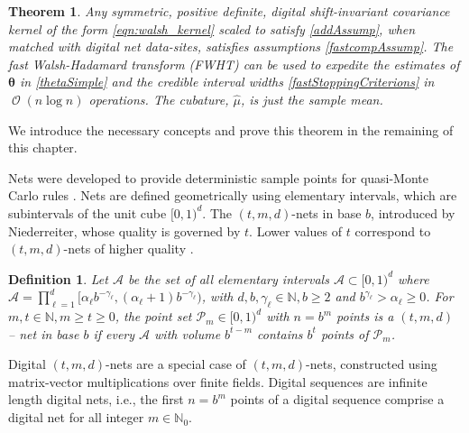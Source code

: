 \documentclass{iitthesis}          %
\DeclareMathOperator{\Order}{{\mathcal O}}
\newtheorem{defn}{Definition}
\newcommand{\bm}[1]{\boldsymbol{#1}}
\newcommand{\naturals}{\mathbb{N}}
\newcommand{\vtheta}{{\bm{\theta}}}
\newcommand{\hmu}{\widehat{\mu}}
\newcommand{\JRNote}[1]{}
\newtheorem{theorem}{Theorem}[section]
\begin{document}


\begin{theorem}
	Any symmetric, positive definite, digital shift-invariant covariance kernel of the form \eqref{eqn:walsh_kernel} scaled to satisfy \eqref{addAssump}, when matched with digital net data-sites, satisfies assumptions \eqref{fastcompAssump}.  The \emph{fast Walsh-Hadamard transform} (FWHT) can be used to expedite the estimates of $\vtheta$ in \eqref{thetaSimple} and the credible interval widths \eqref{fastStoppingCriterions} in $\Order(n \log n)$ operations. The cubature, $\hmu$, is just the sample mean.
\end{theorem}
We introduce the necessary concepts and prove this theorem in the remaining of this chapter.



Nets were developed to provide deterministic sample points for quasi-Monte Carlo rules \cite{Nie05a}. Nets are defined geometrically using elementary intervals, which are subintervals of the unit cube $[0,1)^d$.
The $(t,m, d)$-nets in base $b$, introduced by Niederreiter, 
whose quality is governed by $t$. Lower values of $t$ correspond to $(t,m, d)$-nets of higher quality \cite{Bald10a}.

\begin{defn}
	\label{defn:tmd_net}
	Let $\mathcal{A}$ be the set of all elementary intervals $\mathcal{A} \subset [0, 1)^d$ where
	$\mathcal{A} = \prod_{\ell=1}^d [\alpha_\ell b^{-\gamma_\ell} , (\alpha_\ell + 1) b^{-\gamma_\ell})$, 
	with $d,b,\gamma_\ell \in \naturals, b \ge 2$ 
	and $b^{\gamma_\ell}
	> \alpha_\ell \ge 0$. For $m,t \in \naturals, m \ge t \ge 0$, the point set $\mathcal{P}_m \in [0, 1)^d$ with $n = b^m$ points is a $(t, m, d)$ -- net in base $b$ if every $\mathcal{A}$ with volume $b^{t-m}$ contains $b^t$ points of $\mathcal{P}_m$.
\end{defn}

Digital $(t,m, d)$-nets are a special case of $(t,m, d)$-nets, constructed using matrix-vector multiplications over finite fields. Digital sequences are infinite length digital nets, i.e., the first $n=b^m$ points of a digital sequence comprise a digital net for all integer $m \in \naturals_0$.
\end{document}
